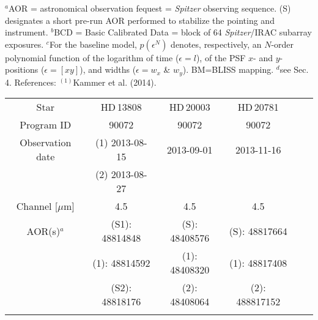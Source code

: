 \documentclass[traditabstract]{aa}
\begin{document}
\begin{appendix}
\begin{table*}
{$^a$AOR = astronomical observation fequest = {\it Spitzer} observing sequence. (S) designates a short pre-run AOR performed to 
stabilize the pointing and instrument.  $^b$BCD = Basic Calibrated Data = block of 64 {\it Spitzer}/IRAC subarray exposures.  
$^c$For the baseline model, $p(\epsilon^N)$ denotes, respectively, an $N$-order polynomial function
 of the logarithm of time ($\epsilon=l$), of the PSF $x$- and $y$-positions ($\epsilon=[xy]$), and widths ($\epsilon=w_x$ \& $w_y$). 
 BM=BLISS mapping. $^d$see Sec. 4. References: $^{(1)}$Kammer et al. (2014).}
\end{table*}

\begin{table*}
\begin{center}
{\scriptsize
\label{tab:targets}
\begin{tabular}{cccccc}
\hline\noalign {\smallskip}
Star &  HD\,13808 & HD\,20003 & HD\,20781& &    \\ \noalign {\smallskip}
\hline \noalign {\smallskip}  
Program ID                                                          & 90072                                & 90072                          &  90072                       \\ \noalign {\smallskip} 
Observation date                                                 & (1) 2013-08-15                  & 2013-09-01                 &  2013-11-16                \\ \noalign {\smallskip} 
                                                                            &  (2) 2013-08-27                 &                                     &                                    \\ \noalign {\smallskip}                                          
Channel       [$\mu$m]                                         & 4.5                                      & 4.5                              & 4.5                              \\ \noalign {\smallskip} 
AOR(s)$^a$                                                        & (S1): 48814848                   & (S): 48408576            & (S): 48817664             \\ \noalign {\smallskip}                                                                                      
                                                                           & (1): 48814592                      & (1): 48408320            & (1): 48817408              \\ \noalign {\smallskip} 
                                                                           & (S2): 48818176                    & (2): 48408064            & (2): 488817152            \\ \noalign {\smallskip} 

\end{tabular}}
\end{center}
\end{table*}
\end{appendix}
\end{document}
